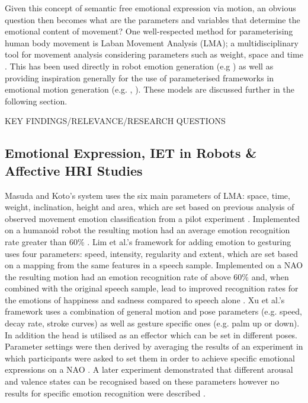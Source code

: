 \documentclass[11pt]{article}
\begin{document}
Given this concept of semantic free emotional expression via motion, an obvious question then becomes what are the parameters and variables that determine the emotional content of movement? One well-respected method for parameterising human body movement is Laban Movement Analysis (LMA); a multidisciplinary tool for movement analysis considering parameters such as weight, space and time \cite{lab2011}. This has been used directly in robot emotion generation (e.g \cite{masuda2010motion}) as well as providing inspiration generally for the use of parameterised frameworks in emotional motion generation (e.g. \cite{lim2011converting}, \cite{xu2013mood}). These models are discussed further in the following section.

KEY FINDINGS/RELEVANCE/RESEARCH QUESTIONS

\subsection{Emotional Expression, IET in Robots \& Affective HRI Studies}

Masuda and Koto's system uses the six main parameters of LMA: space, time, weight, inclination, height and area, which are set based on previous analysis of observed movement emotion classification from a pilot experiment \cite{masuda2009emotion}. Implemented on a humanoid robot the resulting motion had an average emotion recognition rate greater than 60\% \cite{masuda2010motion}. Lim et al.'s framework for adding emotion to gesturing uses four parameters: speed, intensity, regularity and extent, which are set based on a mapping from the same features in a speech sample. Implemented on a NAO the resulting motion had an emotion recognition rate of above 60\% and, when combined with the original speech sample, lead to improved recognition rates for the emotions of happiness and sadness compared to speech alone \cite{lim2011converting}. Xu et al.'s framework uses a combination of general motion and pose parameters (e.g. speed, decay rate, stroke curves) as well as gesture specific ones (e.g. palm up or down). In addition the head is utilised as an effector which can be set in different poses. Parameter settings were then derived by averaging the results of an experiment in which participants were asked to set them in order to achieve specific emotional expressions on a NAO \cite{xu2013mood}. A later experiment demonstrated that different arousal and valence states can be recognised based on these parameters however no results for specific emotion recognition were described \cite{xu2013bodily}.
\end{document}
